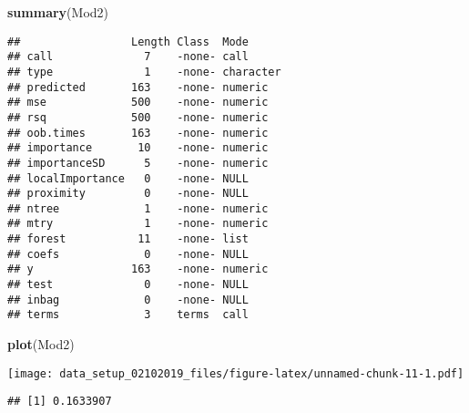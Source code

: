 \documentclass[]{article}
\newenvironment{Shaded}{\begin{snugshade}}{\end{snugshade}}
\newcommand{\KeywordTok}[1]{\textcolor[rgb]{0.13,0.29,0.53}{\textbf{{#1}}}}
\newcommand{\DataTypeTok}[1]{\textcolor[rgb]{0.13,0.29,0.53}{{#1}}}
\newcommand{\StringTok}[1]{\textcolor[rgb]{0.31,0.60,0.02}{{#1}}}
\newcommand{\CommentTok}[1]{\textcolor[rgb]{0.56,0.35,0.01}{\textit{{#1}}}}
\newcommand{\NormalTok}[1]{{#1}}
\begin{document}
\begin{Shaded}
\begin{Highlighting}[]
\KeywordTok{summary}\NormalTok{(Mod2)}
\end{Highlighting}
\end{Shaded}

\begin{verbatim}
##                 Length Class  Mode     
## call              7    -none- call     
## type              1    -none- character
## predicted       163    -none- numeric  
## mse             500    -none- numeric  
## rsq             500    -none- numeric  
## oob.times       163    -none- numeric  
## importance       10    -none- numeric  
## importanceSD      5    -none- numeric  
## localImportance   0    -none- NULL     
## proximity         0    -none- NULL     
## ntree             1    -none- numeric  
## mtry              1    -none- numeric  
## forest           11    -none- list     
## coefs             0    -none- NULL     
## y               163    -none- numeric  
## test              0    -none- NULL     
## inbag             0    -none- NULL     
## terms             3    terms  call
\end{verbatim}

\begin{Shaded}
\begin{Highlighting}[]
\KeywordTok{plot}\NormalTok{(Mod2)}
\end{Highlighting}
\end{Shaded}

\texttt{[image: data\_setup\_02102019\_files/figure-latex/unnamed-chunk-11-1.pdf]}

\begin{Shaded}
\end{Shaded}

\begin{verbatim}
## [1] 0.1633907
\end{verbatim}
\end{document}
